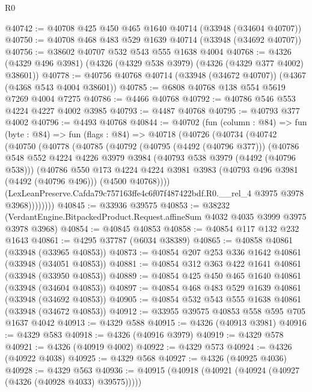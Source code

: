 \begin{lexlean}{R0}
\begin{coremodule}
@40742 := @40708 @425 @450 @465 @1640 @40714 (@33948 (@34604 @40707))
@40750 := @40708 @468 @483 @529 @1639 @40714 (@33948 (@34692 @40707))
@40756 := @38602 @40707 @532 @543 @555 @1638 @4004
@40768 := @4326 (@4329 @496 @3981) (@4326 (@4329 @538 @3979) (@4326 (@4329 @377 @4002) @38601))
@40778 := @40756 @40768 @40714 (@33948 (@34672 @40707)) (@4367 (@4368 @543 @4004 @38601))
@40785 := @6808 @40768 @138 @554 @5619 @7269 @4004 @7275
@40786 := @4466 @40768
@40792 := @40786 @546 @553 @4224 @4227 @4002 @3985
@40793 := @4487 @40768
@40795 := @40793 @377 @4002
@40796 := @4493 @40768
@40844 := @40702
    (fun (column : @84) =>
    fun (byte : @84) =>
    fun (flags : @84) =>
    @40718
      (@40726
        (@40734
          (@40742
            (@40750
              (@40778
                (@40785
                  (@40792
                    (@40795 (@4492 (@40796 @377)))
                    (@40786
                      @548
                      @552
                      @4224
                      @4226
                      @3979
                      @3984
                      (@40793 @538 @3979 (@4492 (@40796 @538)))
                      (@40786
                        @550
                        @173
                        @4224
                        @4224
                        @3981
                        @3983
                        (@40793 @496 @3981 (@4492 (@40796 @496)))
                        (@4500 @40768))))
                  (LexLeanPreserve.Cafda79c757163ffe4c6f07f487422bdf.R0.__rel_4
                    @3975
                    @3978
                    @3968))))))))
@40845 := @33936 @39575
@40853 := @38232
    (VerdantEngine.BitpackedProduct.Request.affineSum @4032 @4035 @3999 @3975 @3978 @3968)
@40854 := @40845 @40853
@40858 := @40854 @117 @132 @232 @1643
@40861 := @4295 @37787 (@6034 @38389)
@40865 := @40858 @40861 (@33948 (@33965 @40853))
@40873 := @40854 @207 @253 @336 @1642 @40861 (@33948 (@34051 @40853))
@40881 := @40854 @312 @363 @422 @1641 @40861 (@33948 (@33950 @40853))
@40889 := @40854 @425 @450 @465 @1640 @40861 (@33948 (@34604 @40853))
@40897 := @40854 @468 @483 @529 @1639 @40861 (@33948 (@34692 @40853))
@40905 := @40854 @532 @543 @555 @1638 @40861 (@33948 (@34672 @40853))
@40912 := @33955 @39575 @40853 @558 @595 @705 @1637 @4042
@40913 := @4329 @588
@40915 := @4326 (@40913 @3981)
@40916 := @4329 @583
@40918 := @4326 (@40916 @3979)
@40919 := @4329 @578
@40921 := @4326 (@40919 @4002)
@40922 := @4329 @573
@40924 := @4326 (@40922 @4038)
@40925 := @4329 @568
@40927 := @4326 (@40925 @4036)
@40928 := @4329 @563
@40936 := @40915 (@40918 (@40921 (@40924 (@40927 (@4326 (@40928 @4033) @39575)))))

\end{coremodule}
\end{lexlean}
